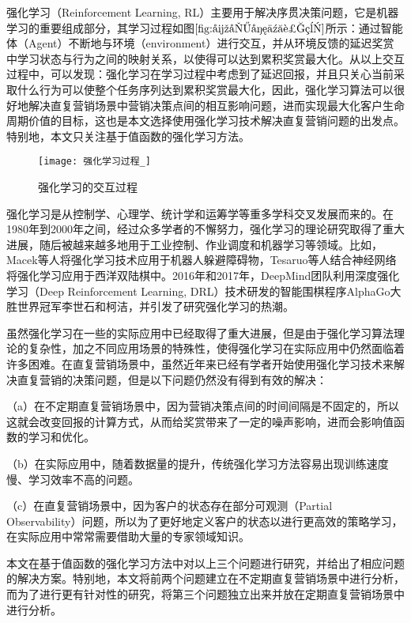 强化学习（Reinforcement Learning, RL）主要用于解决序贯决策问题，它是机器学习的重要组成部分，其学习过程如图$\ref{fig:强化学习过程}$所示：通过智能体（Agent）不断地与环境（environment）进行交互，并从环境反馈的延迟奖赏中学习状态与行为之间的映射关系，以使得可以达到累积奖赏最大化\citep{2016面向强化学习的模型学习算法研究}。从以上交互过程中，可以发现：强化学习在学习过程中考虑到了延迟回报，并且只关心当前采取什么行为可以使整个任务序列达到累积奖赏最大化，因此，强化学习算法可以很好地解决直复营销场景中营销决策点间的相互影响问题，进而实现最大化客户生命周期价值的目标，这也是本文选择使用强化学习技术解决直复营销问题的出发点。特别地，本文只关注基于值函数的强化学习方法。

\begin{figure}[htbp]
\centering
\texttt{[image: 强化学习过程\_]}
\caption{强化学习的交互过程}
\label{fig:强化学习过程}
\end{figure}

强化学习是从控制学、心理学、统计学和运筹学等重多学科交叉发展而来的。在1980年到2000年之间，经过众多学者的不懈努力，强化学习的理论研究取得了重大进展，随后被越来越多地用于工业控制、作业调度和机器学习等领域。比如，Macek等人将强化学习技术应用于机器人躲避障碍物\citep{macek2002reinforcement}，Tesaruo等人结合神经网络将强化学习应用于西洋双陆棋中\citep{tesauro2006hybrid}。2016年和2017年，DeepMind团队利用深度强化学习（Deep Reinforcement Learning, DRL）技术研发的智能围棋程序AlphaGo大胜世界冠军李世石和柯洁，并引发了研究强化学习的热潮。

虽然强化学习在一些的实际应用中已经取得了重大进展，但是由于强化学习算法理论的复杂性，加之不同应用场景的特殊性，使得强化学习在实际应用中仍然面临着许多困难。在直复营销场景中，虽然近年来已经有学者开始使用强化学习技术来解决直复营销的决策问题，但是以下问题仍然没有得到有效的解决：

（a）在不定期直复营销场景中，因为营销决策点间的时间间隔是不固定的，所以这就会改变回报的计算方式，从而给奖赏带来了一定的噪声影响，进而会影响值函数的学习和优化。

（b）在实际应用中，随着数据量的提升，传统强化学习方法容易出现训练速度慢、学习效率不高的问题。

（c）在直复营销场景中，因为客户的状态存在部分可观测（Partial Observability）问题，所以为了更好地定义客户的状态以进行更高效的策略学习，在实际应用中常常需要借助大量的专家领域知识。

本文在基于值函数的强化学习方法中对以上三个问题进行研究，并给出了相应问题的解决方案。特别地，本文将前两个问题建立在不定期直复营销场景中进行分析，而为了进行更有针对性的研究，将第三个问题独立出来并放在定期直复营销场景中进行分析。


